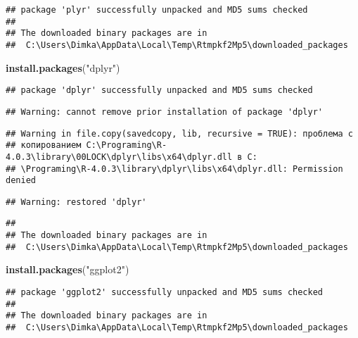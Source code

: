 \documentclass[
]{article}
\newenvironment{Shaded}{\begin{snugshade}}{\end{snugshade}}
\newcommand{\KeywordTok}[1]{\textcolor[rgb]{0.13,0.29,0.53}{\textbf{#1}}}
\newcommand{\NormalTok}[1]{#1}
\newcommand{\StringTok}[1]{\textcolor[rgb]{0.31,0.60,0.02}{#1}}
\begin{document}
\begin{verbatim}
## package 'plyr' successfully unpacked and MD5 sums checked
## 
## The downloaded binary packages are in
##  C:\Users\Dimka\AppData\Local\Temp\Rtmpkf2Mp5\downloaded_packages
\end{verbatim}

\begin{Shaded}
\begin{Highlighting}[]
\KeywordTok{install.packages}\NormalTok{(}\StringTok{"dplyr"}\NormalTok{)}
\end{Highlighting}
\end{Shaded}

\begin{verbatim}
## package 'dplyr' successfully unpacked and MD5 sums checked
\end{verbatim}

\begin{verbatim}
## Warning: cannot remove prior installation of package 'dplyr'
\end{verbatim}

\begin{verbatim}
## Warning in file.copy(savedcopy, lib, recursive = TRUE): проблема с
## копированием C:\Programing\R-4.0.3\library\00LOCK\dplyr\libs\x64\dplyr.dll в C:
## \Programing\R-4.0.3\library\dplyr\libs\x64\dplyr.dll: Permission denied
\end{verbatim}

\begin{verbatim}
## Warning: restored 'dplyr'
\end{verbatim}

\begin{verbatim}
## 
## The downloaded binary packages are in
##  C:\Users\Dimka\AppData\Local\Temp\Rtmpkf2Mp5\downloaded_packages
\end{verbatim}

\begin{Shaded}
\begin{Highlighting}[]
\KeywordTok{install.packages}\NormalTok{(}\StringTok{"ggplot2"}\NormalTok{)}
\end{Highlighting}
\end{Shaded}

\begin{verbatim}
## package 'ggplot2' successfully unpacked and MD5 sums checked
## 
## The downloaded binary packages are in
##  C:\Users\Dimka\AppData\Local\Temp\Rtmpkf2Mp5\downloaded_packages
\end{verbatim}
\end{document}

